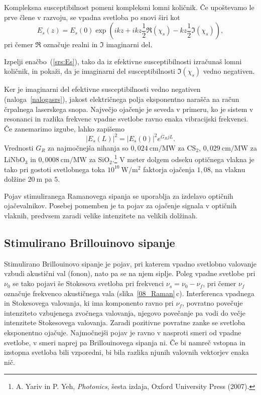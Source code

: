 Kompleksna susceptibilnost pomeni kompleksni lomni količnik. Če upoštevamo
le prve člene v razvoju, se vpadna svetloba po snovi širi kot
\begin{equation}
E_s(z) = E_s(0)\exp\left(i k z + ikz\frac{1}{2}\Re(\chi_s)- k z \frac{1}{2}\Im(\chi_s)\right),
\label{srs:Es}
\end{equation}
pri čemer $\Re$ označuje realni in $\Im$ imaginarni del.
\begin{definition}
\label{nalogasrs}
 Izpelji enačbo~(\ref{srs:Es}), tako da iz efektivne susceptibilnosti izračunaš lomni količnik,
in pokaži, da je imaginarni del susceptibilnosti $\Im(\chi_s)$ vedno negativen. 
\end{definition}
Ker je imaginarni del efektivne susceptibilnosti vedno negativen (naloga~\ref{nalogasrs}), 
jakost e\-lek\-trič\-nega polja eksponentno narašča na račun črpalnega laserskega snopa. 
Največjo ojačenje je seveda v primeru, ko je sistem v resonanci
in razlika frekvenc vpadne svetlobe ravno enaka vibracijski frekvenci.
Če zanemarimo izgube, lahko zapišemo
\begin{equation}
|E_s(L)|^2 = |E_s(0)|^2 e^{G_RjL}.
\end{equation}
Vrednosti $G_R$ za najmočnejša nihanja so $0,024~\si{\cm/\mega\watt}$ za CS$_2$, 
$0,029~\si{\cm/\mega\watt}$ za LiNbO$_3$ 
in $0,0008~\si{\cm/\mega\watt}$ za SiO$_2$.\footnote{A. Yariv in 
P. Yeh, {\it Photonics}, šesta izdaja, Oxford University Press (2007).}
V meter dolgem odseku optičnega vlakna je tako pri gostoti svetlobnega toka 
$10^{10}~\si{\watt/\meter^2}$  faktorja ojačenja $1,08$, na vlaknu dolžine $20~\si{\metre}$
pa $5$.

\begin{remark}
Pojav stimuliranega Ramanovega sipanja se uporablja za izdelavo optičnih 
ojačevalnikov. Posebej pomemben je ta pojav za ojačenje signala v 
optičnih vlaknih, predvsem zaradi velike intenzitete na velikih dolžinah.
\end{remark}

\subsection*{Stimulirano Brillouinovo sipanje}
Stimulirano Brillouinovo sipanje je pojav, pri katerem vpadno svetlobno valovanje
vzbudi akustični val (fonon), nato pa se na njem siplje. Poleg vpadne svetlobe pri $\nu_0$
se tako pojavi še Stokesova svetloba pri frekvenci $\nu_s = \nu_0-\nu_f$, pri čemer 
$\nu_f$ označuje frekvenco akustičnega vala  (slika~\ref{08_Raman}\,c). Interferenca
vpadnega in Stokesovega valovanja, ki ima komponento ravno pri $\nu_f$, povratno
povečuje intenziteto vzbujenega zvočnega valovanja, njegovo povečanje pa vodi do
večje intenzitete Stokesovega valovanja. Zaradi pozitivne povratne zanke se 
svetloba eksponentno ojačuje. Najmočnejši pojav je 
ravno v nasproti smeri od vpadne svetlobe, v smeri naprej pa Brillouinovega sipanja ni.
Če bi namreč vstopna in izstopna svetloba bili vzporedni, bi bila razlika njunih
valovnih vektorjev enaka nič. 

